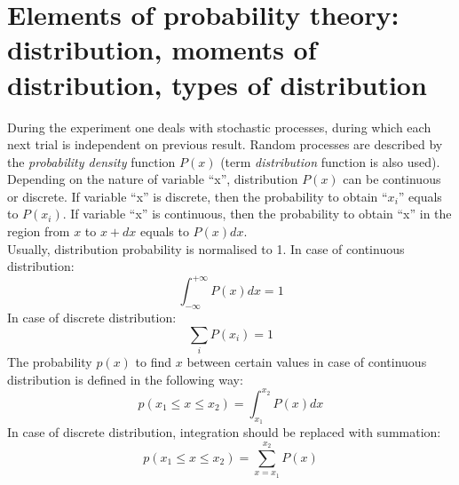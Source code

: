 \documentclass[12pt,a4paper]{report}
\begin{document}
\section{Elements of probability theory: distribution, moments of distribution, types of distribution}
During the experiment one deals with stochastic processes, during which each next trial is independent on previous result. Random processes are described by the \textit{probability density} function $P(x)$ (term \textit{distribution} function is also used). Depending on the nature of variable \enquote{x}, distribution $P(x)$ can be continuous or discrete. If variable \enquote{x} is discrete, then the probability to obtain \enquote{$x_i$} equals to $P(x_i)$. If variable \enquote{x} is continuous, then the probability to obtain \enquote{x} in the region from $x$ to $x+dx$ equals to $P(x)dx$. \\
Usually, distribution probability is normalised to 1. In case of continuous distribution:
\begin{equation} \label{norm_P_1}
\int_{-\infty}^{+\infty} P(x)dx = 1
\end{equation}
In case of discrete distribution:
\begin{equation} \label{norm_P_2}
\sum_{i} P(x_i) = 1
\end{equation}
The probability $p(x)$ to find $x$ between certain values in case of continuous distribution is defined in the following way:
\begin{equation} \label{prob_find_1}
p(x_1 \leq x \leq x_2) = \int_{x_1}^{x_2} P(x)dx
\end{equation}
In case of discrete distribution, integration should be replaced with summation:
\begin{equation} \label{prob_find_2}
p(x_1 \leq x \leq x_2) = \sum_{x = x_1}^{x_2} P(x)
\end{equation}
\end{document}
